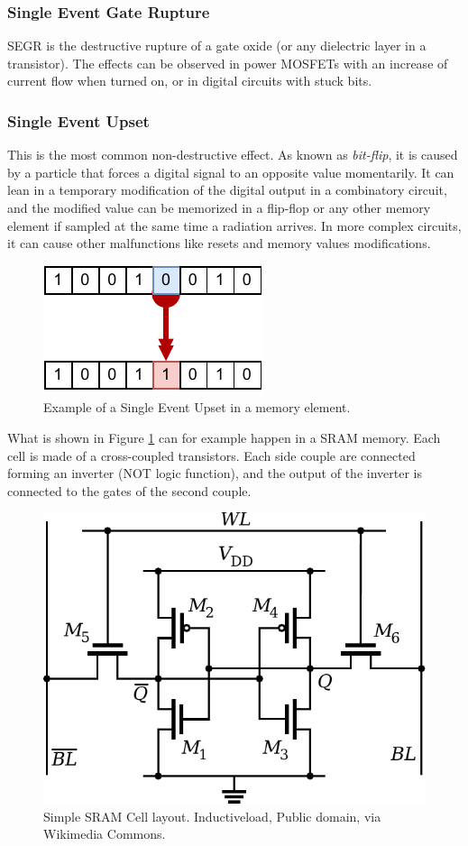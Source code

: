 \subsubsection{Single Event Gate Rupture}
SEGR is the destructive rupture of a gate oxide (or any dielectric layer in a transistor). The effects can be observed in power MOSFETs with an increase of current flow when turned on, or in digital circuits with stuck bits. 

\subsubsection{Single Event Upset}
This is the most common non-destructive effect. As known as \textit{bit-flip}, it is caused by a particle that forces a digital signal to an opposite value momentarily. It can lean in a temporary modification of the digital output in a combinatory circuit, and the modified value can be memorized in a flip-flop or any other memory element if sampled at the same time a radiation arrives. In more complex circuits, it can cause other malfunctions like resets and memory values modifications. \bigskip

\begin{figure}[H]
\centering
\includegraphics[height=0.2\linewidth]{images/chapter2/SEU_EXAMPLE.pdf}
\caption{Example of a Single Event Upset in a memory element.}
\label{fig:seu_example}
\end{figure}

What is shown in Figure \ref{fig:seu_example} can for example happen in a SRAM memory. Each cell is made of a cross-coupled transistors. Each side couple are connected forming an inverter (NOT logic function), and the output of the inverter is connected to the gates of the second couple.  

\begin{figure}[H]
\centering
\includegraphics[height=0.5\linewidth]{images/chapter2/SRAM_CELL.pdf}
\caption{Simple SRAM Cell layout. Inductiveload, Public domain, via Wikimedia Commons.}
\label{fig:sram_cell_layout}
\end{figure}

